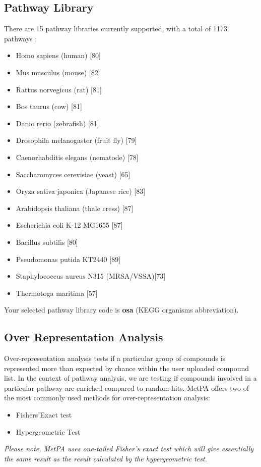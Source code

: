 \documentclass[a4paper]{article}
\begin{document}
\subsection{Pathway Library}

There are 15 pathway libraries currently supported, with a total of 1173 pathways :

\begin{itemize}
\item{Homo sapiens (human) [80]}
\item{Mus musculus (mouse) [82]}
\item{Rattus norvegicus (rat) [81]}
\item{Bos taurus (cow) [81]}
\item{Danio rerio (zebrafish) [81]}
\item{Drosophila melanogaster (fruit fly) [79]}
\item{Caenorhabditis elegans (nematode) [78]}
\item{Saccharomyces cerevisiae (yeast) [65]}
\item{Oryza sativa japonica (Japanese rice) [83]}
\item{Arabidopsis thaliana (thale cress) [87]}
\item{Escherichia coli K-12 MG1655 [87]}
\item{Bacillus subtilis [80]}
\item{Pseudomonas putida KT2440 [89]}
\item{Staphylococcus aureus N315 (MRSA/VSSA)[73]}
\item{Thermotoga maritima [57]}
\end{itemize}



Your selected pathway library code is \textbf{ osa }(KEGG organisms abbreviation).


\subsection{Over Representation Analysis}

Over-representation analysis tests if a particular group of compounds
is represented more than expected by chance within the user uploaded compound
list. In the context of pathway analysis, we are testing if compounds involved
in a particular pathway are enriched compared to random hits. MetPA offers two of the
most commonly used methods for over-representation analysis: 

\begin{itemize}
\item{Fishers'Exact test}
\item{Hypergeometric Test}
\end{itemize}
\textit{Please note, MetPA uses one-tailed Fisher's exact test which will give essentially
the same result as the result calculated by the hypergeometric test.}
\end{document}

